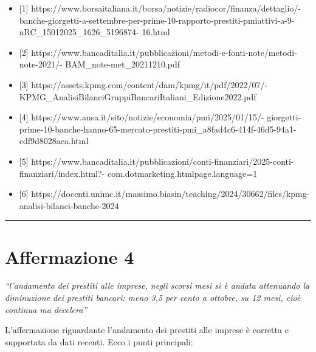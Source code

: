 \documentclass[
  letterpaper,
  DIV=11,
  numbers=noendperiod]{scrartcl}
\providecommand{\tightlist}{%
  \setlength{\itemsep}{0pt}\setlength{\parskip}{0pt}}\usepackage{longtable,booktabs,array}
\begin{document}
\begin{itemize}
\tightlist
\item
  {[}1{]}
  https://www.borsaitaliana.it/borsa/notizie/radiocor/finanza/dettaglio/-
  banche-giorgetti-a-settembre-per-prime-10-rapporto-prestiti-pmiattivi-a-9-nRC\_15012025\_1626\_5196874-
  16.html
\item
  {[}2{]}
  https://www.bancaditalia.it/pubblicazioni/metodi-e-fonti-note/metodi-note-2021/-
  BAM\_note-met\_20211210.pdf
\item
  {[}3{]} https://assets.kpmg.com/content/dam/kpmg/it/pdf/2022/07/-
  KPMG\_AnalisiBilanciGruppiBancariItaliani\_Edizione2022.pdf
\item
  {[}4{]} https://www.ansa.it/sito/notizie/economia/pmi/2025/01/15/-
  giorgetti-prime-10-banche-hanno-65-mercato-prestiti-pmi\_a8fad4c6-414f-46d5-94a1-cdf9d8028aea.html
\item
  {[}5{]}
  https://www.bancaditalia.it/pubblicazioni/conti-finanziari/2025-conti-finanziari/index.html?-
  com.dotmarketing.htmlpage.language=1
\item
  {[}6{]}
  https://docenti.unimc.it/massimo.biasin/teaching/2024/30662/files/kpmg-analisi-bilanci-banche-2024
\end{itemize}

\begin{center}\rule{0.5\linewidth}{0.5pt}\end{center}

\section{Affermazione 4}\label{affermazione-4}

\emph{``l'andamento dei prestiti alle imprese, negli scorsi mesi si è
andata attenuando la diminuzione dei prestiti bancari: meno 3,5 per
cento a ottobre, su 12 mesi, cioè continua ma decelera''}

L'affermazione riguardante l'andamento dei prestiti alle imprese è
corretta e supportata da dati recenti. Ecco i punti principali:
\end{document}
